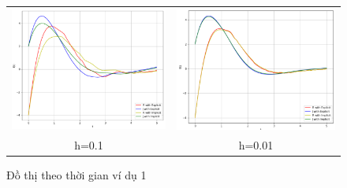 \documentclass[a4paper]{article}
\begin{document}
\begin{enumerate}
\begin{enumerate}
\begin{figure}[htp]
\begin{tabular}{cc}
        \includegraphics[scale=.58]{Images/Bt4/vd1/h=0,1.png} &
        \includegraphics[scale = .58]{Images/Bt4/vd1/h=0.01.png} \\
        h=0.1 & h=0.01
    \end{tabular}
    \caption{Đồ thị theo thời gian ví dụ 1}
    

\end{figure}
\end{enumerate}
\end{enumerate}
\end{document}
